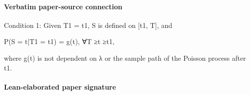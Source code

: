 \documentclass[10pt]{article}
\begin{document}
\paragraph{Verbatim paper-source connection}
\begin{ReviewVerbatim}
Condition 1: Given T1 = t1, S is defined on [t1, T], and

P(S = t|T1 = t1) = g(t), ∀T ≥t ≥t1,

where g(t) is not dependent on λ or the sample path of the Poisson process after t1.
\end{ReviewVerbatim}



\paragraph{Lean-elaborated paper signature}
\end{document}
